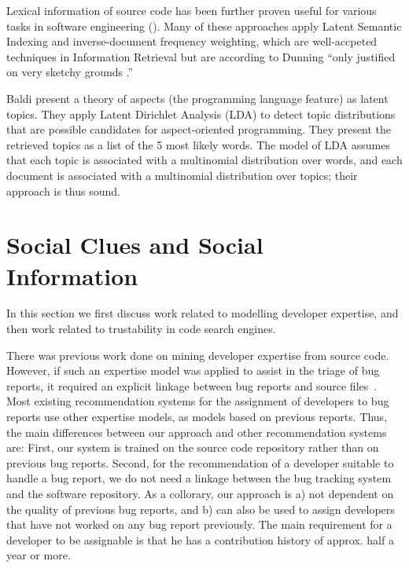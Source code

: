 Lexical information of source code has been further proven useful for various tasks in software engineering (\eg \cite{Anto02a,Marc05a,Posh09a}). Many of these approaches apply Latent Semantic Indexing and inverse-document frequency weighting, which are well-accpeted techniques in Information Retrieval but are according to Dunning ``only justified on very sketchy grounds \cite{Dunning}.''

Baldi \etal \cite{Bald08a} present a theory of aspects (the programming language feature) as latent topics. They apply Latent Dirichlet Analysis (LDA) to detect topic distributions that are possible candidates for aspect-oriented programming. They present the retrieved topics as a list of the 5 most likely words. The model of LDA assumes that each topic is associated with a multinomial distribution over words, and each document is associated with a multinomial distribution over topics; their approach is thus sound.


\section{Social Clues and Social Information}

In this section we first discuss work related to modelling developer expertise, and then work related to trustability in code search engines.

There was previous work done on mining developer expertise from source code. However, if such an expertise model was applied to assist in the triage of bug reports, it required an explicit linkage between bug reports and source files~\cite{Anvik07}. Most existing recommendation systems for the assignment of developers to bug reports use other expertise models, as \eg models based on previous reports. Thus, the main differences between our approach and other recommendation systems are: First, our system is trained on the source code repository rather than on previous bug reports. Second, for the recommendation of a developer suitable to handle a bug report, we do not need a linkage between the bug tracking system and the software repository. As a collorary, our approach is a) not dependent on the quality of previous bug reports, and b) can also be used to assign developers that have not worked on any bug report previously. The main requirement for a developer to be assignable is that he has a contribution history of approx. half a year or more.

